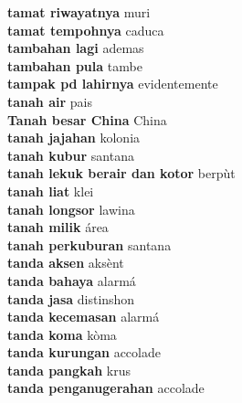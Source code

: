 \textbf{ tamat riwayatnya  } muri \\
\textbf{ tamat tempohnya  } caduca \\
\textbf{ tambahan lagi  } ademas \\
\textbf{ tambahan pula  } tambe \\
\textbf{ tampak pd lahirnya  } evidentemente \\
\textbf{ tanah air  } pais \\
\textbf{ Tanah besar China  } China \\
\textbf{ tanah jajahan  } kolonia \\
\textbf{ tanah kubur  } santana \\
\textbf{ tanah lekuk berair dan kotor  } berpùt \\
\textbf{ tanah liat  } klei \\
\textbf{ tanah longsor  } lawina \\
\textbf{ tanah milik  } área \\
\textbf{ tanah perkuburan  } santana \\
\textbf{ tanda aksen  } aksènt \\
\textbf{ tanda bahaya  } alarmá \\
\textbf{ tanda jasa  } distinshon \\
\textbf{ tanda kecemasan  } alarmá \\
\textbf{ tanda koma  } kòma \\
\textbf{ tanda kurungan  } accolade \\
\textbf{ tanda pangkah  } krus \\
\textbf{ tanda penganugerahan  } accolade \\
